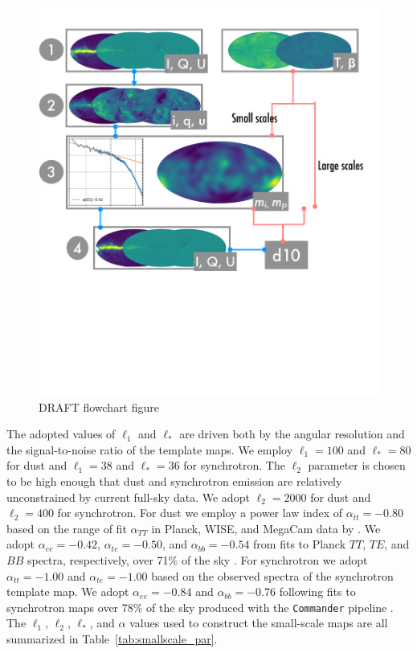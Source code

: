 \documentclass[twocolumn]{aastex631}
\begin{document}
\begin{figure}
    \includegraphics[width=\textwidth]{figures/draft_flowchart_fig_larger_INCOMPLETE.pdf}
    \caption{DRAFT flowchart figure}
    \label{fig:flowchart}
\end{figure}
  
The adopted values of $\ell_1$ and $\ell_*$ are driven both by the angular resolution and the signal-to-noise ratio of the template maps. We employ $\ell_1=100$ and $\ell_*=80$ for dust and $\ell_1=38$ and $\ell_*=36$ for synchrotron. The $\ell_2$ parameter is chosen to be high enough that dust and synchrotron emission are relatively unconstrained by current full-sky data. We adopt  $\ell_2=2000$ for dust and $\ell_2 = 400$ for synchrotron. For dust we employ a power law index of $\alpha_{tt} = -0.80$ based on the range of fit $\alpha_{TT}$ in Planck, WISE, and MegaCam data by \citet{Miville-Deschenes:2016}. We adopt $\alpha_{ee} = -0.42$, $\alpha_{te} = -0.50$, and $\alpha_{bb} = -0.54$ from fits to Planck $TT$, $TE$, and $BB$ spectra, respectively, over 71\% of the sky \citep{planck2016-l11A}. For synchrotron we adopt $\alpha_{tt} = -1.00$ and $\alpha_{te} = -1.00$ based on the observed spectra of the synchrotron template map. We adopt $\alpha_{ee} = -0.84$ and $\alpha_{bb} = -0.76$ following fits to synchrotron maps over 78\% of the sky produced with the \texttt{Commander} pipeline \citep{planck2016-l04}. The $\ell_1$, $\ell_2$, $\ell_*$, and $\alpha$ values used to construct the small-scale maps are all summarized in Table~\ref{tab:smallscale_par}.
\end{document}
